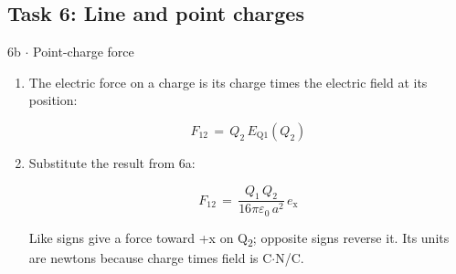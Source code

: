 \documentclass[11pt]{article}
\begin{document}
\begin{keepsection}\subsection{Task 6: Line and point charges}

\begin{workedbox}{6b \ensuremath{\cdot} Point-charge force}
\begin{enumerate}
\item {}
The electric force on a charge is its charge times the electric field at its position:

\begin{equation*}{F}_{12}\, =\, {Q}_{2}\, {E}_{\mathrm{Q}1}({Q}_{2})\end{equation*}
\item {}
Substitute the result from 6a:

\begin{equation*}{F}_{12}\, =\, \dfrac{{Q}_{1}\, {Q}_{2}}{16πε_{0}\, {a}^{2}}\, {e}_{\mathrm{x}}\end{equation*}

Like signs give a force toward +x on Q\textsubscript{2}; opposite signs reverse it. Its units are newtons because charge times field is C\ensuremath{\cdot}N/C.
\end{enumerate}
\end{workedbox}

\end{keepsection}
\end{document}
